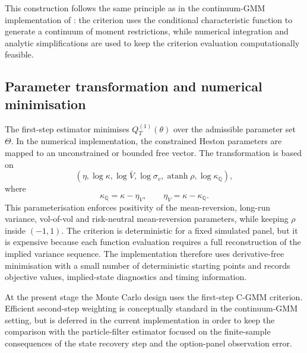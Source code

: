 \documentclass[11pt,a4paper,notitlepage]{article}
\numberwithin{equation}{section}
\begin{document}
This construction follows the same principle as in the continuum-GMM implementation of \citet{boswijk2015asset}: the criterion uses the conditional characteristic function to generate a continuum of moment restrictions, while numerical integration and analytic simplifications are used to keep the criterion evaluation computationally feasible.

\subsection{Parameter transformation and numerical minimisation}

The first-step estimator minimises \(Q_T^{(1)}(\theta)\) over the admissible parameter set \(\Theta\). In the numerical implementation, the constrained Heston parameters are mapped to an unconstrained or bounded free vector. The transformation is based on
\[
\left(
\eta,
\log\kappa,
\log\bar V,
\log\sigma_v,
\operatorname{atanh}\rho,
\log\kappa_{\mathbb Q}
\right),
\]
where
\[
\kappa_{\mathbb Q}=\kappa-\eta_V,
\qquad
\eta_V=\kappa-\kappa_{\mathbb Q}.
\]
This parameterisation enforces positivity of the mean-reversion, long-run variance, vol-of-vol and risk-neutral mean-reversion parameters, while keeping \(\rho\) inside \((-1,1)\). The criterion is deterministic for a fixed simulated panel, but it is expensive because each function evaluation requires a full reconstruction of the implied variance sequence. The implementation therefore uses derivative-free minimisation with a small number of deterministic starting points and records objective values, implied-state diagnostics and timing information.

At the present stage the Monte Carlo design uses the first-step C-GMM criterion. Efficient second-step weighting is conceptually standard in the continuum-GMM setting, but is deferred in the current implementation in order to keep the comparison with the particle-filter estimator focused on the finite-sample consequences of the state recovery step and the option-panel observation error.


\newpage


\nocite{*}

\end{document}
